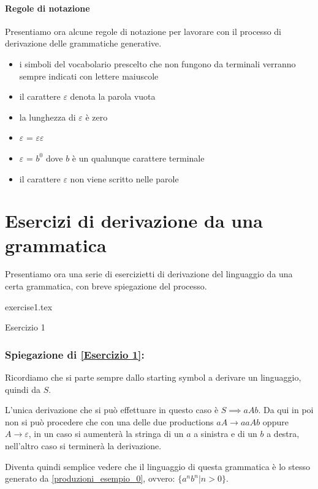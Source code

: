 \documentclass[class=book, crop=false, oneside]{standalone}
\begin{document}
\paragraph{Regole di notazione}
Presentiamo ora alcune regole di notazione per lavorare con il processo di derivazione delle grammatiche generative.
\begin{itemize}
    \item i simboli del vocabolario prescelto che non fungono da terminali verranno sempre indicati con lettere maiuscole
    \item il carattere $\varepsilon$ denota la parola vuota
    \item la lunghezza di $\varepsilon$ è zero
    \item $\varepsilon$ = $\varepsilon$$\varepsilon$
    \item $\varepsilon$ =  $b^0$ dove $b$ è un qualunque carattere terminale
    \item il carattere $\varepsilon$ non viene scritto nelle parole
\end{itemize}

\section{Esercizi di derivazione da una grammatica}
Presentiamo ora una serie di esercizietti di derivazione del linguaggio da una certa grammatica, con breve spiegazione del processo.

\begin{table}[H]
	\centering
	{exercise1.tex}
    \caption{Esercizio 1}
    \label{Esercizio 1}
\end{table}
\subsubsection*{Spiegazione di \ref{Esercizio 1}:}
Ricordiamo che si parte sempre dallo starting symbol a derivare un linguaggio, quindi da $S$.

L'unica derivazione che si può effettuare in questo caso è $S \implies aAb$.
Da qui in poi non si può procedere che con una delle due productions $aA \to aaAb$ oppure $A \to \varepsilon$, in un caso si aumenterà la stringa di un $a$ a sinistra e di un $b$ a destra, nell'altro caso si terminerà la derivazione.

Diventa quindi semplice vedere che il linguaggio di questa grammatica è lo stesso generato da \ref{produzioni_esempio_0}, ovvero: $\{a^n b^n |n>0\}$.
\end{document}
